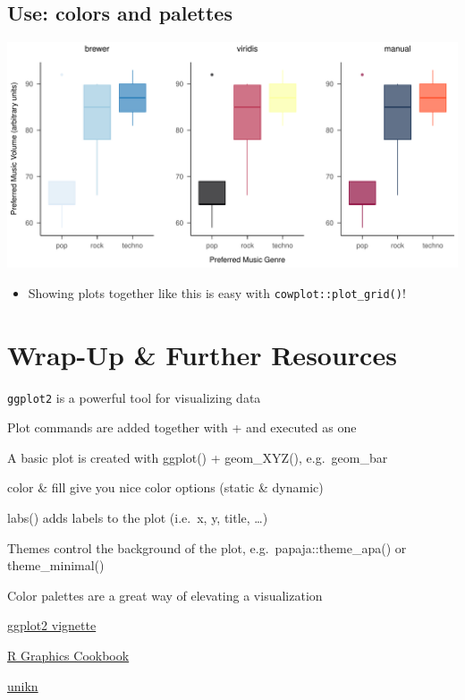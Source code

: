 \documentclass[
]{book}
\providecommand{\tightlist}{%
  \setlength{\itemsep}{0pt}\setlength{\parskip}{0pt}}
\begin{document}
\subsection{Use: colors and palettes}\label{use-colors-and-palettes}

\includegraphics{_main_files/figure-latex/unnamed-chunk-57-1.pdf}

\begin{itemize}
\tightlist
\item
  Showing plots together like this is easy with \texttt{cowplot::plot\_grid()}!
\end{itemize}

\section{Wrap-Up \& Further Resources}\label{wrap-up-further-resources-5}

\texttt{ggplot2} is a powerful tool for visualizing data

Plot commands are added together with + and executed as one

A basic plot is created with ggplot() + geom\_XYZ(), e.g.~geom\_bar

color \& fill give you nice color options (static \& dynamic)

labs() adds labels to the plot (i.e.~x, y, title, \ldots)

Themes control the background of the plot, e.g.~papaja::theme\_apa() or theme\_minimal()

Color palettes are a great way of elevating a visualization

\href{https://ggplot2.tidyverse.org/articles/ggplot2.html}{ggplot2 vignette}

\href{https://r-graphics.org/}{R Graphics Cookbook}

\href{https://hneth.github.io/unikn/index.html}{unikn}
\end{document}
